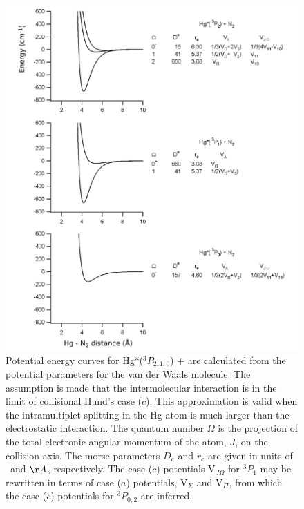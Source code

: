 \documentclass[12pt]{mitthesis}
\begin{document}
\begin{figure}
  \caption{Potential energy curves for Hg*($^3P_{2,1,0}$) + 
    are calculated from the potential parameters for the  van
    der Waals molecule.  The assumption is made that the
    intermolecular interaction is in the limit of collisional Hund's
    case ($c$).  This approximation is valid when the intramultiplet
    splitting in the Hg atom is much larger than the electrostatic
    interaction.  The quantum number $\Omega$ is the projection of the
    total electronic angular momentum of the atom, $J$, on the
    collision axis.  The morse parameters $D_e$ and $r_e$ are given in
    units of \rcm\ and $\AA$, respectively.  The case ($c$) potentials
    V$_{J \Omega}$ for $^3P_1$ may be rewritten in terms of case ($a$)
    potentials, V$_\Sigma$ and V$_\Pi$, from which the case ($c$)
    potentials for $^3P_{0,2}$ are inferred.}
  \label{fig:hgn2}
  \centering
  \vspace{3mm}
  \includegraphics[width=6in]{hgn2.pdf}
\end{figure}
\end{document}
